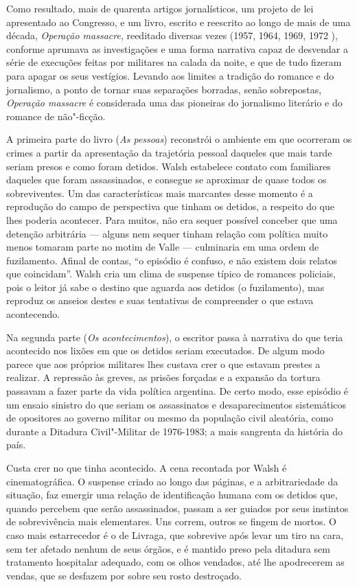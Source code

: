 Como resultado, mais de quarenta artigos jornalísticos, um projeto de
lei apresentado ao Congresso, e um livro, escrito e reescrito ao longo
de mais de uma década, \emph{Operação massacre}, reeditado diversas
vezes (1957, 1964, 1969, 1972 ), conforme aprumava as investigações e
uma forma narrativa capaz de desvendar a série de execuções feitas por
militares na calada da noite, e que de tudo fizeram para apagar os seus
vestígios. Levando aos limites a tradição do romance e do jornalismo, a
ponto de tornar suas separações borradas, senão sobrepostas,
\emph{Operação massacre} é considerada uma das pioneiras do jornalismo
literário e do romance de não"-ficção.

A primeira parte do livro (\emph{As pessoas}) reconstrói o ambiente em
que ocorreram os crimes a partir da apresentação da trajetória pessoal
daqueles que mais tarde seriam presos e como foram detidos. Walsh
estabelece contato com familiares daqueles que foram assassinados, e
consegue se aproximar de quase todos os sobreviventes. Um das
características mais marcantes desse momento é a reprodução do campo de
perspectiva que tinham os detidos, a respeito do que lhes poderia
acontecer. Para muitos, não era sequer possível conceber que uma
detenção arbitrária --- alguns nem sequer tinham relação com política
muito menos tomaram parte no motim de Valle --- culminaria em uma ordem
de fuzilamento. Afinal de contas, ``o episódio é confuso, e não existem
dois relatos que coincidam''. Walsh cria um clima de suspense típico de
romances policiais, pois o leitor já sabe o destino que aguarda aos
detidos (o fuzilamento), mas reproduz os anseios destes e suas
tentativas de compreender o que estava acontecendo.

Na segunda parte (\emph{Os acontecimentos}), o escritor passa à
narrativa do que teria acontecido nos lixões em que os detidos seriam
executados. De algum modo parece que aos próprios militares lhes custava
crer o que estavam prestes a realizar. A repressão às greves, as prisões
forçadas e a expansão da tortura passavam a fazer parte da vida política
argentina. De certo modo, esse episódio é um ensaio sinistro do que
seriam os assassinatos e desaparecimentos sistemáticos de opositores ao
governo militar ou mesmo da população civil aleatória, como durante a
Ditadura Civil"-Militar de 1976-1983; a mais sangrenta da história do
país.

Custa crer no que tinha acontecido. A cena recontada por Walsh é cinematográfica.
O suspense criado ao longo das páginas, e a arbitrariedade da situação,
faz emergir uma relação de identificação humana com os detidos que,
quando percebem que serão assassinados, passam a ser guiados por
seus instintos de sobrevivência mais elementares. Uns correm, outros se fingem de mortos.
O caso mais estarrecedor é o de Livraga, que sobrevive após levar um
tiro na cara, sem ter afetado nenhum de seus órgãos, e é mantido preso
pela ditadura sem tratamento hospitalar adequado, com os olhos vendados,
até lhe apodrecerem as vendas, que se desfazem por sobre seu rosto
destroçado.

